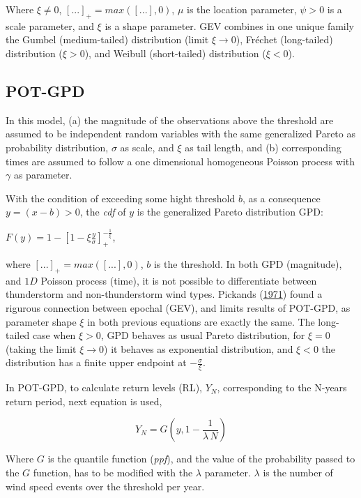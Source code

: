 \documentclass[12pt,oneside]{reedthesis}
\begin{document}
Where \(\xi\neq0\), \([...]_+ = max([...],0)\), \(\mu\) is the location parameter, \(\psi > 0\) is a scale parameter, and \(\xi\) is a shape parameter. GEV combines in one unique family the Gumbel (medium-tailed) distribution (limit \(\xi\rightarrow0\)), Fréchet (long-tailed) distribution (\(\xi>0\)), and Weibull (short-tailed) distribution (\(\xi<0\)).

\hypertarget{pot-gpd}{%
\subsection{POT-GPD}\label{pot-gpd}}

In this model, (a) the magnitude of the observations above the threshold are assumed to be independent random variables with the same generalized Pareto as probability distribution, \(\sigma\) as scale, and \(\xi\) as tail length, and (b) corresponding times are assumed to follow a one dimensional homogeneous Poisson process with \(\gamma\) as parameter.

With the condition of exceeding some hight threshold \(b\), as a consequence \(y = (x-b) > 0\), the \emph{cdf} of \(y\) is the generalized Pareto distribution GPD:

\(F(y) = 1 - \left[1-\xi\frac{y}{\sigma}\right]^{-\frac{1}{\xi}}_+\),

where \([...]_+ = max([...],0)\), \(b\) is the threshold. In both GPD (magnitude), and \(1D\) Poisson process (time), it is not possible to differentiate between thunderstorm and non-thunderstorm wind types. Pickands (\protect\hyperlink{ref-Pickands1971}{1971}) found a rigurous connection between epochal (GEV), and limits results of POT-GPD, as parameter shape \(\xi\) in both previous equations are exactly the same. The long-tailed case when \(\xi>0\), GPD behaves as usual Pareto distribution, for \(\xi = 0\) (taking the limit \(\xi\rightarrow0\)) it behaves as exponential distribution, and \(\xi<0\) the distribution has a finite upper endpoint at \(-\frac{\sigma}{\xi}\).

In POT-GPD, to calculate return levels (RL), \(Y_N\), corresponding to the N-years return period, next equation is used,

\[
Y_N =G\left(y, 1-\frac{1}{\lambda\,N}\right)
\]

Where \(G\) is the quantile function (\emph{ppf}), and the value of the probability passed to the \(G\) function, has to be modified with the \(\lambda\) parameter. \(\lambda\) is the number of wind speed events over the threshold per year.
\end{document}
